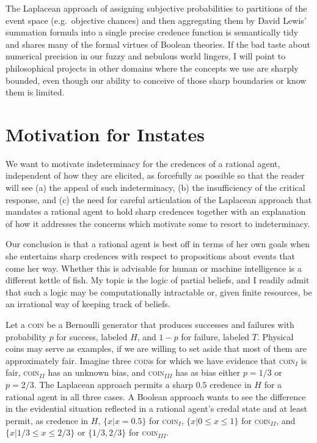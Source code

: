 \documentclass[11pt]{article}
\begin{document}
The Laplacean approach of assigning subjective probabilities to
partitions of the event space (e.g.\ objective chances) and then
aggregating them by David Lewis' summation formula into a single
precise credence function is semantically tidy and shares many of the
formal virtues of Boolean theories. If the bad taste about numerical
precision in our fuzzy and nebulous world lingers, I will point to
philosophical projects in other domains where the concepts we use are
sharply bounded, even though our ability to conceive of those sharp
boundaries or know them is limited.

\section{Motivation for Instates}
\label{MotivationForIndeterminateCredalStates}

We want to motivate indeterminacy for the credences of a rational
agent, independent of how they are elicited, as forcefully as possible
so that the reader will see (a) the appeal of such indeterminacy, (b)
the insufficiency of the critical response, and (c) the need for
careful articulation of the Laplacean approach that mandates a
rational agent to hold sharp credences together with an explanation of
how it addresses the concerns which motivate some to resort to
indeterminacy.

Our conclusion is that a rational agent is best off in
terms of her own goals when she entertains sharp credences with
respect to propositions about events that come her way. Whether this
is advisable for human or machine intelligence is a different kettle
of fish. My topic is the logic of partial beliefs, and I readily admit
that such a logic may be computationally intractable or, given finite
resources, be an irrational way of keeping track of
beliefs.

Let a \textsc{coin} be a Bernoulli generator that produces successes
and failures with probability $p$ for success, labeled $H$, and $1-p$
for failure, labeled $T$. Physical coins may serve as examples, if we
are willing to set aside that most of them are approximately fair.
Imagine three \textsc{coin}s for which we have evidence that
\textsc{coin}$_{I}$ is fair, \textsc{coin}$_{II}$ has an unknown bias,
and \textsc{coin}$_{III}$ has as bias either $p=1/3$ or $p=2/3$. The
Laplacean approach permits a sharp $0.5$ credence in $H$ for a
rational agent in all three cases. A Boolean approach wants to see the
difference in the evidential situation reflected in a rational agent's
credal state and at least permit, as credence in $H$, $\{x|x=0.5\}$
for \textsc{coin}$_{I}$, $\{x|0\leq{}x\leq{}1\}$ for
\textsc{coin}$_{II}$, and $\{x|1/3\leq{}x\leq{}2/3\}$ or $\{1/3,2/3\}$
for \textsc{coin}$_{III}$.
\end{document}
